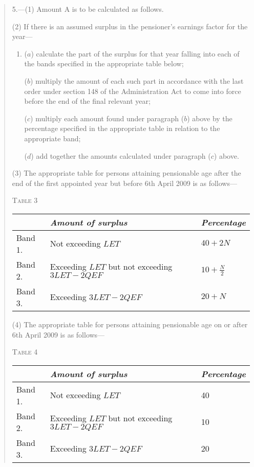 \documentclass[12pt,a4paper]{article}
\begin{document}
\begin{quotation}
5.---(1) Amount A is to be calculated as follows.

(2) If there is an assumed surplus in the pensioner’s earnings factor for the year—
\begin{enumerate}\item[]
($a$) calculate the part of the surplus for that year falling into each of the bands specified in the appropriate table below;

($b$) multiply the amount of each such part in accordance with the last order under section 148 of the Administration Act to come into force before the end of the final relevant year;

($c$) multiply each amount found under paragraph ($b$)  above by the percentage specified in the appropriate table in relation to the appropriate band;

($d$) add together the amounts calculated under paragraph ($c$)  above.
\end{enumerate}

(3) The appropriate table for persons attaining pensionable age after the end of the first appointed year but before 6th April 2009 is as follows—

\medskip
\pagebreak[3]

\noindent\textsc{Table 3}

{\noindent\footnotesize
\begin{tabulary}{\linewidth}{JJJ}
\hline
&\itshape Amount of surplus	&\itshape Percentage\\
\hline
Band 1. 	&Not exceeding $LET$	&$40 + 2N$\\
Band 2. 	&Exceeding $LET$ but not exceeding $3LET - 2QEF$	&$10 + \frac{N}{2}$\\
Band 3. 	&Exceeding $3LET - 2QEF$	&$20 + N$\\
\hline
\end{tabulary}

}

\medskip

(4) The appropriate table for persons attaining pensionable age on or after 6th April 2009 is as follows—

\medskip

\noindent\textsc{Table 4}

{\noindent\footnotesize
\begin{tabulary}{\linewidth}{JJJ}
\hline
&\itshape Amount of surplus	&\itshape Percentage\\
\hline
Band 1. 	&Not exceeding $LET$	&40\\
Band 2. 	&Exceeding $LET$ but not exceeding $3LET - 2QEF$	&10\\
Band 3. 	&Exceeding $3LET - 2QEF$	&20\\
\hline
\end{tabulary}

}
\end{quotation}
\end{document}
